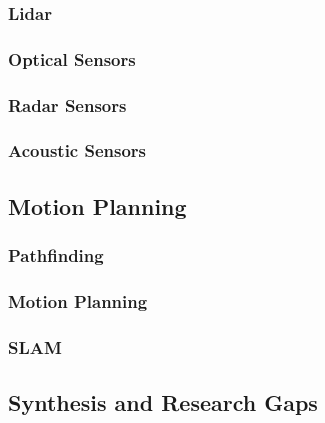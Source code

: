 \subsubsection{Lidar}



\subsubsection{Optical Sensors}




\subsubsection{Radar Sensors}




\subsubsection{Acoustic Sensors}





\subsection{Motion Planning}




\subsubsection{Pathfinding}




\subsubsection{Motion Planning}





\subsubsection{SLAM}




\subsection{Synthesis and Research Gaps }




